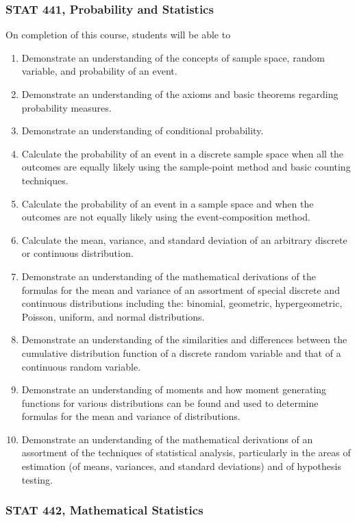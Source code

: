 \documentclass[11pt]{article}
\newenvironment{alphalist}{
\begin{enumerate}[label=(\arabic*),widest=107 ,leftmargin=25pt, itemsep=0pt]}
{\end{enumerate}}
\begin{document}
\subsubsection*{STAT 441, Probability and Statistics}

On completion of this course, students will be able to
\begin{alphalist}
	\item Demonstrate an understanding of the concepts of sample space, random variable, and probability of an event.
	\item Demonstrate an understanding of the axioms and basic theorems regarding probability measures.
	\item Demonstrate an understanding of conditional probability.
	\item Calculate the probability of an event in a discrete sample space when all the outcomes are equally likely using the sample-point method and basic counting techniques.
	\item Calculate the probability of an event in a sample space and when the outcomes are not equally likely using the event-composition method.
	\item Calculate the mean, variance, and standard deviation of an arbitrary discrete or continuous distribution.
	\item Demonstrate an understanding of the mathematical derivations of the formulas for the mean and variance of an assortment of special discrete and continuous distributions including the: binomial, geometric, hypergeometric, Poisson, uniform, and normal distributions.
	\item Demonstrate an understanding of the similarities and differences between the cumulative distribution function of a discrete random variable and that of a continuous random variable.
	\item Demonstrate an understanding of moments and how moment generating functions for various distributions can be found and used to determine formulas for the mean and variance of distributions.
	\item Demonstrate an understanding of the mathematical derivations of an assortment of the techniques of statistical analysis, particularly in the areas of estimation (of means, variances, and standard deviations) and of hypothesis testing.
\end{alphalist}
\subsubsection*{STAT 442, Mathematical Statistics}
\end{document}
